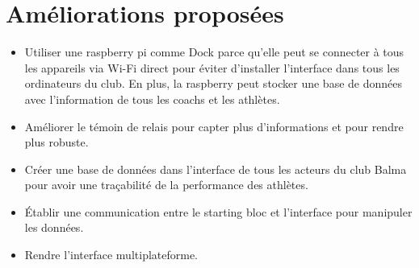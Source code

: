 \documentclass[12pt]{article}
\begin{document}
\section{Améliorations proposées}
\begin{itemize}
	\item Utiliser une raspberry pi comme Dock parce 	qu'elle peut se connecter à tous les appareils via Wi-Fi direct pour éviter d'installer l'interface dans tous les ordinateurs du club. En plus, la raspberry peut stocker une base de données avec l'information de tous les coachs et les athlètes.


	\item Améliorer le témoin de relais pour capter plus d'informations et pour rendre plus robuste.
	\item Créer une base de données dans l'interface de tous les acteurs du club Balma pour avoir une traçabilité de la performance des athlètes.
	\item Établir une communication entre le starting bloc et l'interface pour manipuler les données.
	\item Rendre l'interface multiplateforme.

\end{itemize}
\end{document}
